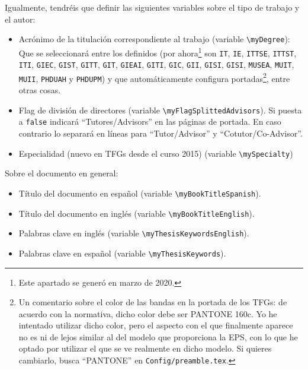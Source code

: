 \documentclass[spanish,openright]{book}
\begin{document}
Igualmente, tendréis que definir las siguientes variables sobre el tipo
de trabajo y el autor:

\begin{itemize} 
\item Acrónimo de la titulación correspondiente al trabajo (variable
  \texttt{\textbackslash{}myDegree}): Que se seleccionará entre los
  definidos (por ahora\footnote{Este apartado se generó en marzo de
    2020.} son \texttt{IT}, \texttt{IE}, \texttt{ITTSE}, \texttt{ITTST},
  \texttt{ITI}, \texttt{GIEC}, \texttt{GIST}, \texttt{GITT},
  \texttt{GIT}, \texttt{GIEAI}, \texttt{GITI}, \texttt{GIC},
  \texttt{GII}, \texttt{GISI}, \texttt{GISI}, \texttt{MUSEA},
  \texttt{MUIT}, \texttt{MUII}, \texttt{PHDUAH} y \texttt{PHDUPM}) y que
  automáticamente configura portadas\footnote{Un comentario sobre el
    color de las bandas en la portada de los TFGs: de acuerdo con la
    normativa, dicho color debe ser PANTONE 160c. Yo he intentado
    utilizar dicho color, pero el aspecto con el que finalmente aparece
    no es ni de lejos similar al del modelo que proporciona la EPS, con
    lo que he optado por utilizar el que se ve realmente en dicho
    modelo. Si quieres cambiarlo, busca ``PANTONE'' en
    \texttt{Config/preamble.tex}.}, entre otras cosas.

\item Flag de división de directores (variable
  \texttt{\textbackslash{}myFlagSplittedAdvisors}). Si puesta a
  \texttt{false} indicará ``Tutores/Advisors'' en las páginas de
  portada. En caso contrario lo separará en líneas para
  ``Tutor/Advisor'' y ``Cotutor/Co-Advisor''.

\item Especialidad (nuevo en TFGs desde el curso 2015) (variable
  \texttt{\textbackslash{}mySpecialty})

\end{itemize}

Sobre el documento en general:

\begin{itemize}
\item Título del documento en español (variable
  \texttt{\textbackslash{}myBookTitleSpanish}).
\item Título del documento en inglés (variable
  \texttt{\textbackslash{}myBookTitleEnglish}).
\item Palabras clave en inglés (variable \texttt{\textbackslash{}myThesisKeywordsEnglish}).
\item Palabras clave en español (variable \texttt{\textbackslash{}myThesisKeywords}).


\end{itemize}
\end{document}
